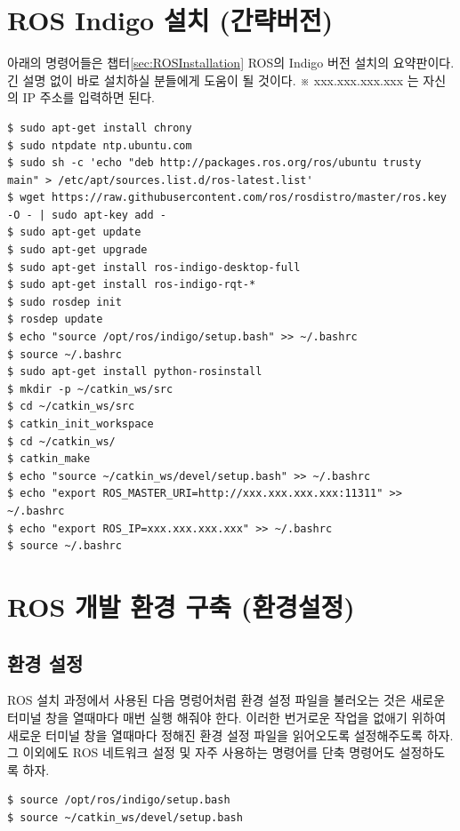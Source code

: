 \section{ROS Indigo 설치 (간략버전)}

아래의 명령어들은 챕터\ref{sec:ROSInstallation} ROS의 Indigo 버전 설치의 요약판이다. 긴 설명 없이 바로 설치하실 분들에게 도움이 될 것이다. ※ xxx.xxx.xxx.xxx 는 자신의 IP 주소를 입력하면 된다.

\begin{lstlisting}[language=ROS]
$ sudo apt-get install chrony
$ sudo ntpdate ntp.ubuntu.com
$ sudo sh -c 'echo "deb http://packages.ros.org/ros/ubuntu trusty main" > /etc/apt/sources.list.d/ros-latest.list'
$ wget https://raw.githubusercontent.com/ros/rosdistro/master/ros.key -O - | sudo apt-key add -
$ sudo apt-get update
$ sudo apt-get upgrade
$ sudo apt-get install ros-indigo-desktop-full
$ sudo apt-get install ros-indigo-rqt-*
$ sudo rosdep init
$ rosdep update
$ echo "source /opt/ros/indigo/setup.bash" >> ~/.bashrc
$ source ~/.bashrc
$ sudo apt-get install python-rosinstall
$ mkdir -p ~/catkin_ws/src
$ cd ~/catkin_ws/src
$ catkin_init_workspace
$ cd ~/catkin_ws/
$ catkin_make
$ echo "source ~/catkin_ws/devel/setup.bash" >> ~/.bashrc
$ echo "export ROS_MASTER_URI=http://xxx.xxx.xxx.xxx:11311" >> ~/.bashrc
$ echo "export ROS_IP=xxx.xxx.xxx.xxx" >> ~/.bashrc
$ source ~/.bashrc
\end{lstlisting}

\section{ROS 개발 환경 구축 (환경설정)}

\subsection{환경 설정}

ROS 설치 과정에서 사용된 다음 명렁어처럼 환경 설정 파일을 불러오는 것은 새로운 터미널 창을 열때마다 매번 실행 해줘야 한다. 이러한 번거로운 작업을 없애기 위하여 새로운 터미널 창을 열때마다 정해진 환경 설정 파일을 읽어오도록 설정해주도록 하자. 그 이외에도 ROS 네트워크 설정 및 자주 사용하는 명령어를 단축 명령어도 설정하도록 하자.
\\
\begin{lstlisting}[language=ROS]
$ source /opt/ros/indigo/setup.bash
$ source ~/catkin_ws/devel/setup.bash
\end{lstlisting}

